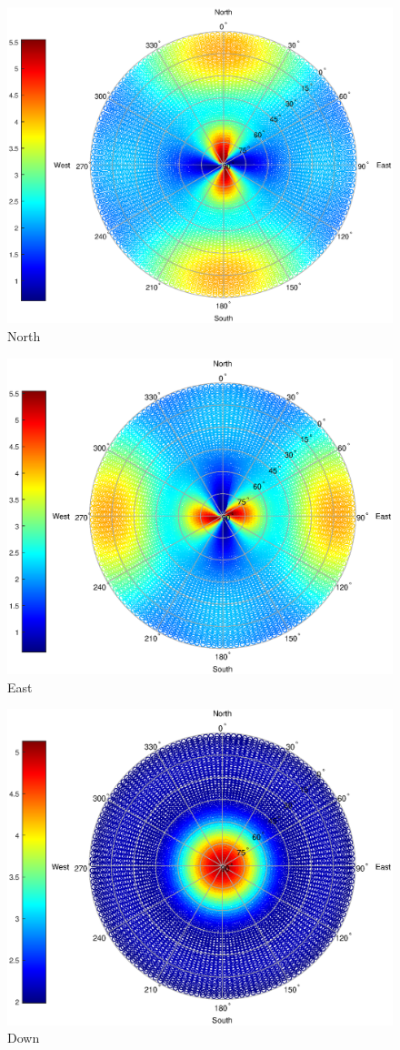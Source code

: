 \begin{figure}
\centering
\caption{North}
\label{fig:plane_total_north1_pow4}
\includegraphics[width=0.7\linewidth]{ChapterExperiments/Figures/plane_total_north1_pow4}
\end{figure}

\begin{figure}
\centering
\caption{East}
\label{fig:plane_total_east_pow4}
\includegraphics[width=0.7\linewidth]{ChapterExperiments/Figures/plane_total_east_pow4}
\end{figure}

\begin{figure}
\centering
\caption{Down}
\label{fig:plane_total_down_pow4}
\includegraphics[width=0.7\linewidth]{ChapterExperiments/Figures/plane_total_down_pow4}
\end{figure}

